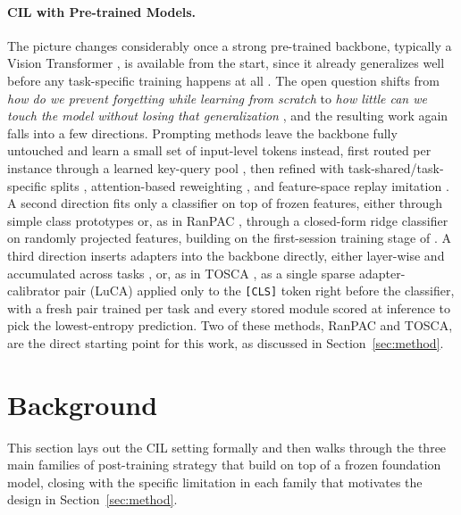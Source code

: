 \documentclass{article}
\begin{document}
\paragraph{CIL with Pre-trained Models.}
The picture changes considerably once a strong pre-trained backbone,
typically a Vision Transformer \citep{dosovitskiy2021image}, is available
from the start, since it already generalizes well before any task-specific
training happens at all \citep{ramasesh2022effect,mehta2023empirical}. The
open question shifts from \emph{how do we prevent forgetting while learning
from scratch} to \emph{how little can we touch the model without losing
that generalization} \citep{wu2022classincremental}, and the resulting work
again falls into a few directions. Prompting methods leave the backbone
fully untouched and learn a small set of input-level tokens instead, first
routed per instance through a learned key-query pool \citep{wang2022learning},
then refined with task-shared/task-specific splits
\citep{wang2022dualprompt}, attention-based reweighting
\citep{smith2023coda}, and feature-space replay imitation
\citep{wang2023hierarchical}. A second direction fits only a classifier on
top of frozen features, either through simple class prototypes
\citep{zhou2024revisiting} or, as in RanPAC \citep{mcdonnell2023ranpac},
through a closed-form ridge classifier on randomly projected features,
building on the first-session training stage of \citet{panos2023first}. A
third direction inserts adapters into the backbone directly, either
layer-wise and accumulated across tasks
\citep{zhou2024expandable,sun2025mos}, or, as in TOSCA
\citep{yildirim2026unlocking}, as a single sparse adapter-calibrator pair
(LuCA) applied only to the \texttt{[CLS]} token right before the
classifier, with a fresh pair trained per task and every stored module
scored at inference to pick the lowest-entropy prediction. Two of these
methods, RanPAC and TOSCA, are the direct starting point for this work, as
discussed in Section~\ref{sec:method}.

\section{Background}
\label{sec:background}

This section lays out the CIL setting formally and then walks through the
three main families of post-training strategy that build on top of a
frozen foundation model, closing with the specific limitation in each
family that motivates the design in Section~\ref{sec:method}.
\end{document}
